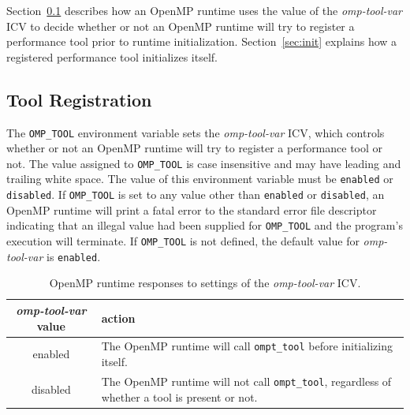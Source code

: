 \documentclass{article}
\begin{document}
Section~\ref{sec:env} describes how an OpenMP runtime uses the value of the {\em omp-tool-var} ICV to decide whether or not an OpenMP runtime will try to register a performance tool prior to runtime initialization.
Section~\ref{sec:init} explains how a registered performance tool initializes itself.

\subsection{Tool Registration}
\label{sec:env}



The  \verb|OMP_TOOL| environment variable sets the {\em omp-tool-var} ICV, which controls whether or not an OpenMP 
runtime will try to register a performance tool or not. The value assigned to \verb|OMP_TOOL| is 
case insensitive and may have leading and trailing white space.  The value of
this environment variable must be \verb|enabled| or \verb|disabled|.   If  \verb|OMP_TOOL| is set to any value other than \verb|enabled| or \verb|disabled|, an OpenMP runtime will print a fatal error  to the standard error file descriptor indicating that an illegal value had been supplied for \verb|OMP_TOOL| and the program's execution will terminate. If \verb|OMP_TOOL| is not defined, the default value for  {\em omp-tool-var}  is  \verb|enabled|.



 \begin{table}
\begin{center}
\begin{tabular}{|c|p{4.5in}|}
\hline
 {\em omp-tool-var} value & action \\\hline
enabled & The OpenMP runtime will call  \verb|ompt_tool| before initializing itself.   \\\hline
disabled & The OpenMP runtime will not call  \verb|ompt_tool|, regardless of whether a tool is present or not.  \\\hline

\end{tabular}
\end{center}
\caption{OpenMP runtime responses to settings of the {\em omp-tool-var} ICV.}
\label{table:env-var}
\end{table}
\end{document}
